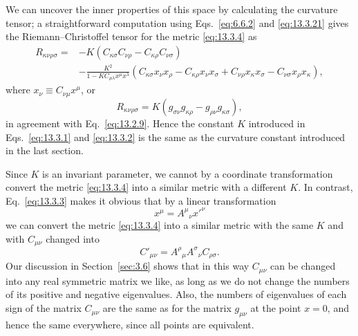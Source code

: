 We can uncover the inner properties of this space by calculating the curvature
tensor; a straightforward computation using Eqs.~\eqref{eq:6.6.2} and
\eqref{eq:13.3.21} gives the Riemann--Christoffel tensor for the metric
\eqref{eq:13.3.4} as
\[
  \begin{aligned}
  R_{\kappa\nu\rho\sigma}
  ={}&
  -K\left(
    C_{\kappa\sigma}C_{\nu\rho}
    -C_{\kappa\rho}C_{\nu\sigma}
  \right)
  \\
  &-\frac{K^2}{1-KC_{\mu\lambda}x^\mu x^\lambda}
  \left(
    C_{\kappa\sigma}x_\nu x_\rho
    -C_{\kappa\rho}x_\nu x_\sigma
    +C_{\nu\rho}x_\kappa x_\sigma
    -C_{\nu\sigma}x_\rho x_\kappa
  \right),
  \end{aligned}
\]
where \(x_\nu\equiv C_{\nu\mu}x^\mu\), or
\[
  R_{\kappa\nu\rho\sigma}
  =
  K\left(
    g_{\sigma\nu}g_{\kappa\rho}
    -g_{\rho\nu}g_{\kappa\sigma}
  \right),
\]
in agreement with Eq.~\eqref{eq:13.2.9}. Hence the constant \(K\) introduced
in Eqs.~\eqref{eq:13.3.1} and \eqref{eq:13.3.2} is the same as the curvature
constant introduced in the last section.

Since \(K\) is an invariant parameter, we cannot by a coordinate
transformation convert the metric \eqref{eq:13.3.4} into a similar metric
with a different \(K\). In contrast, Eq.~\eqref{eq:13.3.3} makes it obvious
that by a linear transformation
\[
  x^\mu=A^\mu{}_\nu x'^\nu
\]
we can convert the metric \eqref{eq:13.3.4} into a similar metric with the
same \(K\) and with \(C_{\mu\nu}\) changed into
\[
  C'_{\mu\nu}
  =
  A^\rho{}_\mu A^\sigma{}_\nu C_{\rho\sigma}.
\]
Our discussion in Section~\ref{sec:3.6} shows that in this way
\(C_{\mu\nu}\) can be changed into any real symmetric matrix we like, as long
as we do not change the numbers of its positive and negative eigenvalues.
Also, the numbers of eigenvalues of each sign of the matrix \(C_{\mu\nu}\)
are the same as for the matrix \(g_{\mu\nu}\) at the point \(x=0\), and hence
the same everywhere, since all points are equivalent.

